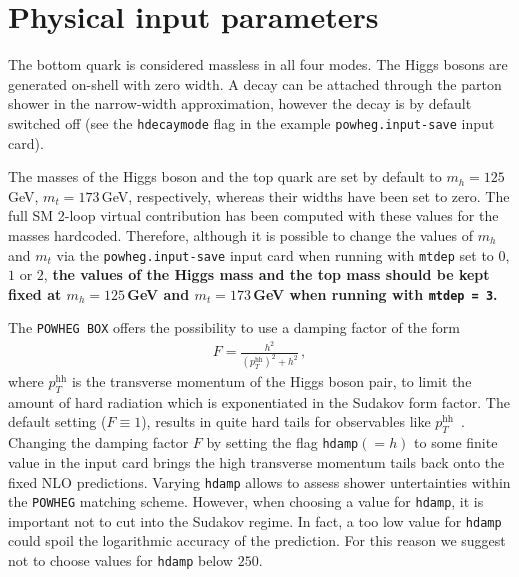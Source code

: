 \documentclass[paper]{JHEP3}
\newcommand\POWHEG{{\tt POWHEG}}
\newcommand\POWHEGBOX{{\tt POWHEG BOX}}
\newcommand\pthh{\ensuremath{p_{T}^{\mathrm{hh}}}\xspace}
\begin{document}
\section{Physical input parameters}

The bottom quark is considered massless in all four modes. The Higgs
bosons are generated on-shell with zero width. A decay can be attached
through the parton shower in the narrow-width approximation, however
the decay is by default switched off (see the {\tt hdecaymode} flag in the
example {\tt powheg.input-save} input card).

The masses of the Higgs boson and the top quark are set by default to
$m_h=125$\,GeV, $m_t=173$\,GeV, respectively, whereas their widths
have been set to zero. The full SM 2-loop virtual contribution has
been computed with these values for the masses hardcoded. 
Therefore, although it is possible to change the values of $m_h$
and $m_t$ via the {\tt powheg.input-save} input card when running with
{\tt mtdep} set to $0$, $1$ or $2$, {\bf the values of the Higgs mass and
the top mass should be kept fixed at $m_h=125$\,GeV and $m_t=173$\,GeV
when running with {\tt mtdep = 3}.}

The \POWHEGBOX{} offers the possibility to use a damping factor of the
form~\cite{Alioli:2008tz,Alioli:2009je}
\begin{align}
  F=\frac{h^{2}}{(\pthh)^2+h^{2}}\,,
\end{align}
where \pthh is the transverse momentum of the Higgs boson pair, to
limit the amount of hard radiation which is exponentiated in the
Sudakov form factor. The default setting ($F\equiv1$), results in
quite hard tails for observables like
$\pthh$~\cite{Heinrich:2017kxx}. Changing the damping factor $F$ by
setting the flag {\tt hdamp}$(=h)$ to some finite value in the input
card brings the high transverse momentum tails back onto the fixed NLO
predictions. Varying {\tt hdamp} allows to assess shower untertainties
within the \POWHEG{} matching scheme. However, when choosing a value
for {\tt hdamp}, it is important not to cut into the Sudakov
regime. In fact, a too low value for {\tt hdamp} could spoil the
logarithmic accuracy of the prediction. For this reason we suggest not
to choose values for {\tt hdamp} below $250$.
\end{document}
